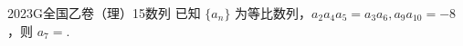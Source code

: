 
\begin{problem}{2023}{G}{全国乙卷（理）}{15}{数列}
已知 $\{a_n\}$ 为等比数列，$a_2 a_4 a_5 = a_3 a_6, a_9 a_{10} = -8$，则 $a_7=$\underline{\hspace{4em}}.
\end{problem}